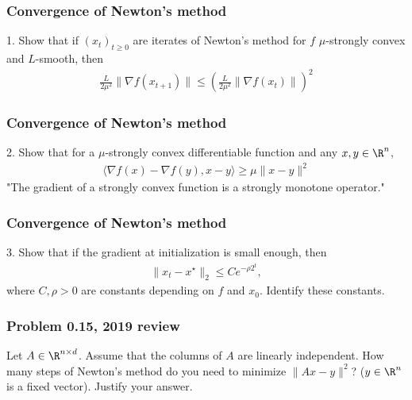 \documentclass{beamer}
\begin{document}
\begin{frame}[t]
\frametitle{Convergence of Newton's method}
\vspace{-7pt}
1. Show that if ${(x_{t})}_{t \geq 0}$ are iterates of Newton's method for $f$ $\mu$-strongly convex and $L$-smooth, then  
\begin{align*}
\frac{L}{2 \mu^2} \|\nabla f(x_{t+1})\| \leq \left(\frac{L}{2 \mu^2} \|\nabla f(x_{t})\| \right)^2
\end{align*}
\end{frame}

\begin{frame}[t]
\frametitle{Convergence of Newton's method}
\vspace{-7pt}
2. Show that for a $\mu$-strongly convex differentiable function and any $x, y \in \R^n$,
\begin{align*}
\langle \nabla f(x) - \nabla f(y), x - y \rangle \geq \mu \|x-y\|^2
\end{align*}
"The gradient of a strongly convex function is a strongly monotone operator."
\end{frame}

\begin{frame}[t]
\frametitle{Convergence of Newton's method}
\vspace{-7pt}
3. Show that if the gradient at initialization is small enough, then 
\begin{align*}
\|x_t - x^{\star}\|_2 \leq C e^{-\rho 2^t},
\end{align*}
where $C, \rho > 0$ are constants depending on $f$ and $x_0$. Identify these constants.
\end{frame}

\begin{frame}[t]
\frametitle{Problem 0.15, 2019 review}
\vspace{-5pt}
Let $A \in \R^{n \times d}$. Assume that the columns of $A$ are linearly independent. How many steps of Newton’s method do you need to minimize
$\|Ax-y\|^2$? ($y \in \R^n$ is a fixed vector). Justify your answer.
\pause
\end{frame}
\end{document}
